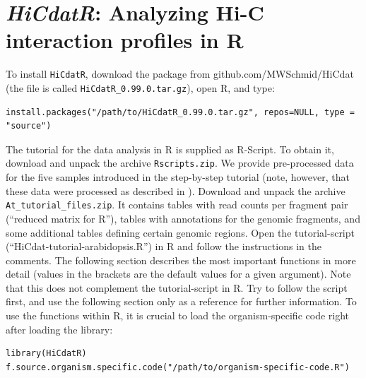 \documentclass[a4paper,10pt]{article}
\newcommand{\myWeb}{github.com/MWSchmid/HiCdat}
\begin{document}
\section{\textit{HiCdatR}: Analyzing Hi-C interaction profiles in R}
To install \texttt{HiCdatR}, download the package from {\myWeb} (the file is called \texttt{HiCdatR\_0.99.0.tar.gz}), open R, and type:
\begin{verbatim}
install.packages("/path/to/HiCdatR_0.99.0.tar.gz", repos=NULL, type = "source")
\end{verbatim}
The tutorial for the data analysis in R is supplied as R-Script. To obtain it, download and unpack the archive \texttt{Rscripts.zip}. We provide pre-processed data for the five samples introduced in the step-by-step tutorial (note, however, that these data were processed as described in \cite{2014_Grob}). Download and unpack the archive \texttt{At\_tutorial\_files.zip}. It contains tables with read counts per fragment pair (``reduced matrix for R''), tables with annotations for the genomic fragments, and some additional tables defining certain genomic regions. Open the tutorial-script (``HiCdat-tutorial-arabidopsis.R'') in R and follow the instructions in the comments. 
\newline
\newline
The following section describes the most important functions in more detail (values in the brackets are the default values for a given argument). Note that this does not complement the tutorial-script in R. Try to follow the script first, and use the following section only as a reference for further information. To use the functions within R, it is crucial to load the organism-specific code right after loading the library:
\begin{verbatim}
library(HiCdatR)
f.source.organism.specific.code("/path/to/organism-specific-code.R")
\end{verbatim}
\clearpage
\end{document}
